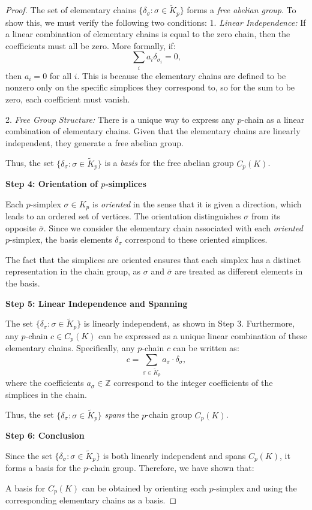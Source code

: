 \documentclass[10pt,a4paper]{amsart}
\begin{document}
\begin{proof}
The set of elementary chains $\{ \delta_\sigma : \sigma \in \widetilde{K}_p \}$ forms a \textit{free abelian group}. To show this, we must verify the following two conditions:
1. \textit{Linear Independence:}  
   If a linear combination of elementary chains is equal to the zero chain, then the coefficients must all be zero. More formally, if:
   \[
   \sum_{i} a_i \delta_{\sigma_i} = 0,
   \]
   then $a_i = 0$ for all $i$. This is because the elementary chains are defined to be nonzero only on the specific simplices they correspond to, so for the sum to be zero, each coefficient must vanish.
   
2. \textit{Free Group Structure:}  
   There is a unique way to express any $p$-chain as a linear combination of elementary chains. Given that the elementary chains are linearly independent, they generate a free abelian group.

Thus, the set $\{ \delta_\sigma : \sigma \in \widetilde{K}_p \}$ is a \textit{basis} for the free abelian group $C_p(K)$.

\textbf{Step 4: Orientation of $p$-simplices}

Each $p$-simplex $\sigma \in K_p$ is \textit{oriented} in the sense that it is given a direction, which leads to an ordered set of vertices. The orientation distinguishes $\sigma$ from its opposite $\bar{\sigma}$. Since we consider the elementary chain associated with each \textit{oriented} $p$-simplex, the basis elements $\delta_\sigma$ correspond to these oriented simplices.

The fact that the simplices are oriented ensures that each simplex has a distinct representation in the chain group, as $\sigma$ and $\bar{\sigma}$ are treated as different elements in the basis.

\textbf{Step 5: Linear Independence and Spanning}

The set $\{ \delta_\sigma : \sigma \in \widetilde{K}_p \}$ is linearly independent, as shown in Step 3. Furthermore, any $p$-chain $c \in C_p(K)$ can be expressed as a unique linear combination of these elementary chains. Specifically, any $p$-chain $c$ can be written as:
\[
c = \sum_{\sigma \in \widetilde{K}_p} a_\sigma \cdot \delta_\sigma,
\]
where the coefficients $a_\sigma \in \mathbb{Z}$ correspond to the integer coefficients of the simplices in the chain.

Thus, the set $\{ \delta_\sigma : \sigma \in \widetilde{K}_p \}$ \textit{spans} the $p$-chain group $C_p(K)$.

\textbf{Step 6: Conclusion}

Since the set $\{ \delta_\sigma : \sigma \in \widetilde{K}_p \}$ is both linearly independent and spans $C_p(K)$, it forms a basis for the $p$-chain group. Therefore, we have shown that:

A basis for  $C_p(K)$ can be obtained by orienting each $p$-simplex and using the corresponding elementary chains as a basis.
\end{proof}
\end{document}
